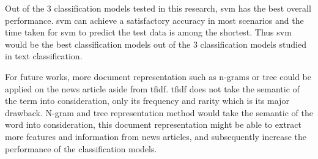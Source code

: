 Out of the 3 classification models tested in this research, \ac{svm} has the best overall performance. \Ac{svm} can achieve a satisfactory accuracy in most scenarios and the time taken for \ac{svm} to predict the test data is among the shortest. Thus \ac{svm} would be the best classification models out of the 3 classification models studied in text classification.

For future works, more document representation such as n-grams or tree could be applied on the news article aside from \ac{tfidf}. \Ac{tfidf} does not take the semantic of the term into consideration, only its frequency and rarity which is its major drawback. N-gram and tree representation method would take the semantic of the word into consideration, this document representation might be able to extract more features and information from news articles, and subsequently increase the performance of the classification models.\\
